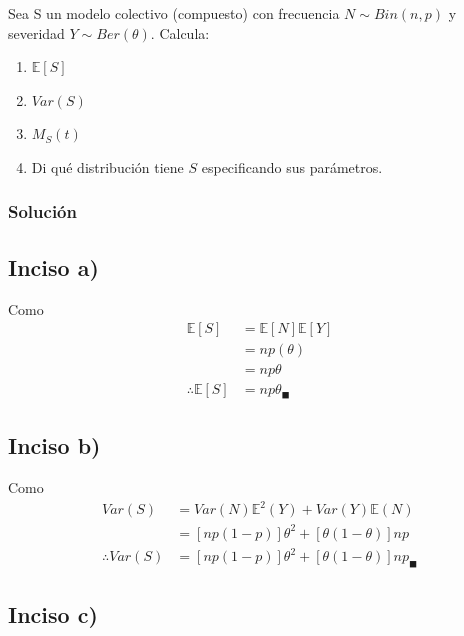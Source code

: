 \documentclass[
]{article}
\begin{document}
Sea S un modelo colectivo (compuesto) con frecuencia \(N\sim Bin(n,p)\)
y severidad \(Y\sim Ber(\theta)\). Calcula:

\begin{enumerate}[label=(\alph*)]
\item  $\mathbb{E}[S]$
\item  $Var(S)$
\item  $M_S(t)$
\item Di qué distribución tiene $S$ especificando sus parámetros.
\end{enumerate}

\hypertarget{soluciuxf3n}{%
\subsubsection{Solución}\label{soluciuxf3n}}

\hypertarget{inciso-a}{%
\subsection{Inciso a)}\label{inciso-a}}

Como \begin{align*}
\mathbb{E}[S] &= \mathbb{E}[N] \mathbb{E}[Y]\\
              &= np(\theta)\\
              &= np\theta\\
\therefore \mathbb{E}[S] &= np\theta_\blacksquare
\end{align*}

\hypertarget{inciso-b}{%
\subsection{Inciso b)}\label{inciso-b}}

Como \begin{align*}
Var(S) &= Var(N) \mathbb{E}^{2}(Y) + Var(Y) \mathbb{E}(N)\\
       &= [np(1-p)]\theta^{2} + [\theta(1 - \theta)] np\\
\therefore Var(S) &= [np(1-p)]\theta^{2} + [\theta(1 - \theta)] np_\blacksquare
\end{align*}

\hypertarget{inciso-c}{%
\subsection{Inciso c)}\label{inciso-c}}
\end{document}
